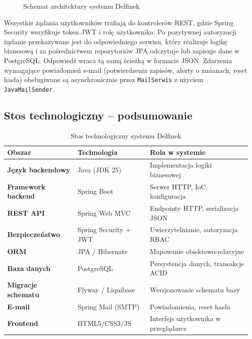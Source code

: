 \documentclass[a4paper,12pt]{article}
\begin{document}
\begin{figure}[H]
\caption{Schemat architektury systemu Delfinek}
\label{fig:architektura}
\end{figure}
 
\noindent Wszystkie żądania użytkowników trafiają do kontrolerów REST, gdzie Spring Security weryfikuje token JWT i rolę użytkownika. Po pozytywnej autoryzacji żądanie przekazywane jest do odpowiedniego serwisu, który realizuje logikę biznesową i za pośrednictwem repozytoriów JPA odczytuje lub zapisuje dane w PostgreSQL. Odpowiedź wraca tą samą ścieżką w formacie JSON. Zdarzenia wymagające powiadomień e-mail (potwierdzenia zapisów, alerty o zmianach, reset hasła) obsługiwane są asynchronicznie przez \texttt{MailSerwis} z użyciem \texttt{JavaMailSender}.
 
\subsection{Stos technologiczny -- podsumowanie}
 
\begin{table}[H]
\centering
\begin{tabular}{>{\bfseries}p{3.8cm} p{4.5cm} p{5.5cm}}
\toprule
Obszar & Technologia & Rola w systemie \\
\midrule
Język backendowy   & Java (JDK 25)         & Implementacja logiki biznesowej \\
Framework backend  & Spring Boot            & Serwer HTTP, IoC, konfiguracja \\
REST API           & Spring Web MVC         & Endpointy HTTP, serializacja JSON \\
Bezpieczeństwo     & Spring Security + JWT  & Uwierzytelnianie, autoryzacja RBAC \\
ORM                & JPA / Hibernate        & Mapowanie obiektowo-relacyjne \\
Baza danych        & PostgreSQL             & Persystencja danych, transakcje ACID \\
Migracje schematu  & Flyway / Liquibase     & Wersjonowanie schematu bazy \\
E-mail             & Spring Mail (SMTP)     & Powiadomienia, reset hasła \\
Frontend           & HTML5/CSS3/JS          & Interfejs użytkownika w przeglądarce \\
\bottomrule
\end{tabular}
\caption{Stos technologiczny systemu Delfinek}
\label{tab:stack}
\end{table}
\end{document}
